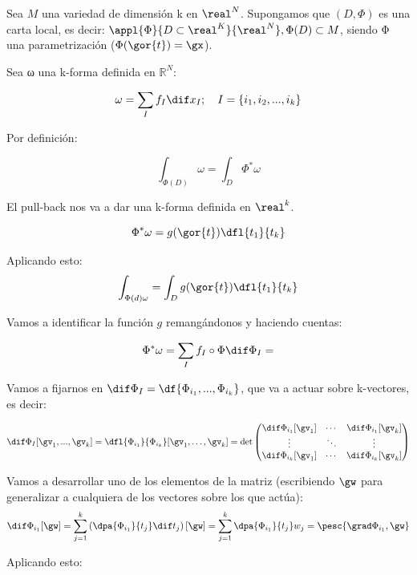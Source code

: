 Sea $M$ una variedad de dimensión k en $\real^N$. Supongamos que $(D,\Phi)$ es una carta local, es decir:
$\appl{\Phi}{D\subset\real^K}{\real^N}, \Phi(D)\subset M$, siendo Φ una parametrización ($\Phi(\gor{t}) = \gx$).

Sea ω una k-forma definida en $ℝ^N$: 

\[\omega = \sum_I f_I\dif x_I; \quad I=\{i_1,i_2,...,i_k\}\]

Por definición:

\begin{equation}
\int_{\Phi(D)} \omega = \int_D \Phi^{\ast}\omega \label{eqIntFDifVar}
\end{equation}

El pull-back nos va a dar una k-forma definida en $\real^k$.

\[
\Phi^{\ast}\omega =g(\gor{t})\dfl{t_1}{t_k}
\]

Aplicando esto:
\[
\int_{\Phi(d) \omega} = \int_D g(\gor{t})\dfl{t_1}{t_k}
\]

Vamos a identificar la función $g$ remangándonos y haciendo cuentas:

\[
\Phi^{\ast} \omega = \sum_I f_I\circ\Phi \dif \Phi_I = 
\]

Vamos a fijarnos en $\dif \Phi_I = \df{\Phi_{i_1},...,\Phi_{i_k}}$, que va a actuar sobre k-vectores, es decir:

\[
\dif \Phi_I[\gv_1,...,\gv_k] = \dfl{\Phi_{i_1}}{\Phi_{i_k}} [\gv_1,\dotsc,\gv_k] 
= \det \begin{pmatrix}
	\dif \Phi_{i_1}[\gv_1] 	& \cdots & \dif \Phi_{i_1}[\gv_k] \\
	\vdots 					& \ddots & \vdots\\
	\dif \Phi_{i_k}[\gv_1] 	& \cdots & \dif \Phi_{i_k}[\gv_k] \\
\end{pmatrix}
\]

Vamos a desarrollar uno de los elementos de la matriz (escribiendo $\gw$ para generalizar a cualquiera de los vectores sobre los que actúa):
\[
\dif \Phi_{i_1}[\gw] = \sum_{j=1}^k \left(\dpa{\Phi_{i_1}}{t_j} \dif t_j\right)[\gw] = \sum_{j=1}^k \dpa{\Phi_{i_1}}{t_j}w_j = \pesc{\grad \Phi_{i_1},\gw}
\]

Aplicando esto:

